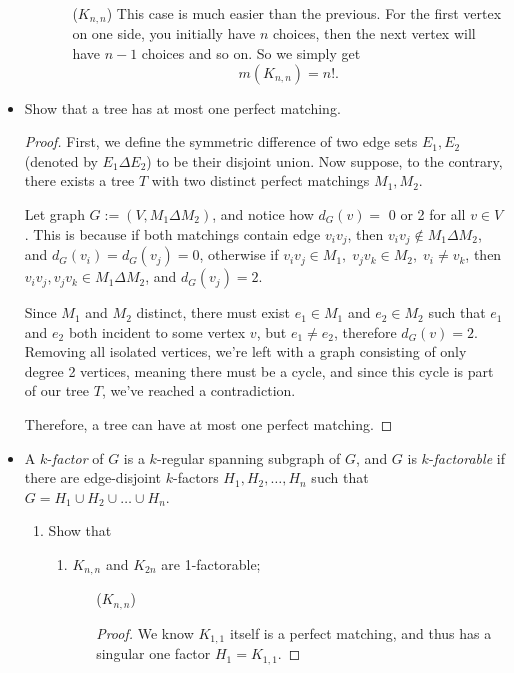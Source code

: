 \documentclass[11pt]{article}
\newcommand\itm[1]{\item[\textbf{#1}]}
\newcommand{\n}{\vspace{0.3cm}}
\begin{document}
\begin{itemize}
\begin{enumerate}[label=(\alph*)]
\begin{itemize}
        \item[(\(K_{n,n}\))] This case is much easier than the previous.  For the first vertex on one side, you initially have \(n\) choices, then the next vertex will have \(n-1\) choices and so on.  So we simply get \[m(K_{n,n}) = n!.\]
      \end{itemize}
  \end{enumerate}


  \itm{5.1.2} Show that a tree has at most one perfect matching.
    \begin{proof}
      First, we define the symmetric difference of two edge sets \(E_1,E_2\) (denoted by \(E_1 \Delta E_2\)) to be their disjoint union.  Now suppose, to the contrary, there exists a tree \(T\) with two distinct perfect matchings \(M_1, M_2\).

      Let graph \(G := (V, M_1 \Delta M_2)\), and notice how \(d_G(v) =\) 0 or 2 for all \(v \in V\).  This is because if both matchings contain edge \(v_iv_j\), then \(v_iv_j \not\in M_1 \Delta M_2\), and \(d_G(v_i) = d_G(v_j) = 0\), otherwise if \(v_iv_j \in M_1, \; v_jv_k \in M_2, \; v_i \neq v_k\), then \(v_iv_j, v_jv_k \in M_1 \Delta M_2\), and \(d_G(v_j) = 2\).

      Since \(M_1\) and \(M_2\) distinct, there must exist \(e_1 \in M_1\) and \(e_2 \in M_2\) such that \(e_1\) and \(e_2\) both incident to some vertex \(v\), but \(e_1 \neq e_2\), therefore \(d_G(v) = 2\).  Removing all isolated vertices, we're left with a graph consisting of only degree 2 vertices, meaning there must be a cycle, and since this cycle is part of our tree \(T\), we've reached a contradiction.

      Therefore, a tree can have at most one perfect matching.
    \end{proof}
  


  \itm{5.1.5} A \(k\)-\textit{factor} of \(G\) is a \(k\)-regular spanning subgraph of \(G\), and \(G\) is \(k\)-\textit{factorable} if there are edge-disjoint \(k\)-factors \(H_1, H_2, \hdots, H_n\) such that \(G = H_1 \cup H_2 \cup \hdots \cup H_n\).
    \begin{enumerate}[label=(\alph*)]
      \item Show that
        \begin{enumerate}[label=(\roman*)]
          \item \(K_{n,n}\) and \(K_{2n}\) are 1-factorable;
            \begin{itemize}
              \item[(\(K_{n,n}\))]  
                \begin{proof}
                  We know \(K_{1,1}\) itself is a perfect matching, and thus has a singular one factor \(H_1 = K_{1,1}\). \n


\end{proof}
\end{itemize}
\end{enumerate}
\end{enumerate}
\end{itemize}
\end{document}
